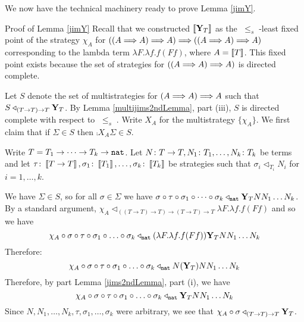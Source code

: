 \documentclass{entcs} \usepackage{prentcsmacro}
\newcommand{\stle}{{\;\le_s\;}}
\newcommand{\0}{{\mathtt{0}}}
\newcommand{\plot}{\triangleleft}
\newcommand{\Chi}{X}
\begin{document}
We now have the technical machinery ready to prove Lemma \ref{jimY}.

\begin{proof*}{Proof of Lemma \ref{jimY}}
  Recall that we constructed $\left\llbracket\mathbf{Y}_T\right\rrbracket$ as the $\stle$-least fixed point of the strategy $\chi_A$ for $((A\Longrightarrow A)\Longrightarrow A)\Longrightarrow((A\Longrightarrow A)\Longrightarrow A)$ corresponding to the lambda term $\lambda F.\lambda f.f(F f)$, where $A=\left\llbracket T\right\rrbracket$.  This fixed point exists because the set of strategies for $((A\Longrightarrow A)\Longrightarrow A)$ is directed complete.  

  Let $S$ denote the set of multistrategies for $(A\Longrightarrow A)\Longrightarrow A$ such that $S\plot_{(T\to T)\to T}\Y_T$.  By Lemma \ref{multijims2ndLemma}, part (iii), $S$ is directed complete with respect to $\stle$.  Write $\Chi_A$ for the multistrategy $\{\chi_A\}$.  We first claim that if $\Sigma\in S$ then $\comp{\Chi_A}{\Sigma}\in S$.

  Write $T=T_1\to\dots\to T_k\to{\mathtt{nat}}$.  Let $N\colon T\to T,N_1\colon T_1,\dots,N_k\colon T_k$ be terms and let $\tau\colon\left\llbracket T\to T\right\rrbracket,\sigma_1\colon\left\llbracket T_1\right\rrbracket,\dots,\sigma_k\colon\left\llbracket T_k\right\rrbracket$ be strategies such that $\sigma_i\plot_{T_i}N_i$ for $i=1,\dots,k$.  

  We have $\Sigma\in S$, so for all $\sigma\in\Sigma$ we have $\comp{\comp\sigma\tau}{\comp{\sigma_1}{\comp{\cdots}{\sigma_k}}}\plot_\nat\Y_TNN_1\dots N_k$.  By a standard argument, $\chi_A\plot_{((T\to T)\to T)\to(T\to T)\to T}\lambda F.\lambda f.f(F f)$ and so we have
  \[
    \icomp{\chi_A}{\icomp{\sigma}{\icomp{\tau}{\icomp{\sigma_1}{\icomp{\dots}{\sigma_k}}}}}\plot_{\nat}(\lambda F.\lambda f.f(F f))\Y_T N N_1\dots N_k
    \]
  Therefore:
  \[
    \icomp{\chi_A}{\icomp{\sigma}{\icomp{\tau}{\icomp{\sigma_1}{\icomp{\dots}{\sigma_k}}}}}\plot_{\nat}N(\Y_T) N N_1\dots N_k
    \]
  Therefore, by part Lemma \ref{jims2ndLemma}, part (i), we have
  \[
    \icomp{\chi_A}{\icomp{\sigma}{\icomp{\tau}{\icomp{\sigma_1}{\icomp{\dots}{\sigma_k}}}}}\plot_{\nat}\Y_T N N_1\dots N_k
    \]
  Since $N,N_1,\dots,N_k,\tau,\sigma_1,\dots,\sigma_k$ were arbitrary, we see that $\icomp{\chi_A}{\sigma}\plot_{(T\to T)\to T}\Y_T$.
\end{proof*}



\end{document}
